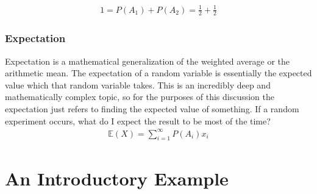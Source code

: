 \documentclass{article}
\begin{document}
\begin{align*}
1 = P(A_1) + P(A_2) = \tfrac{1}{2} + \tfrac{1}{2}
\end{align*}

\subsubsection{Expectation}
Expectation is a mathematical generalization of the weighted average or the arithmetic mean. The expectation of a random variable is essentially the expected value which that random variable takes. This is an incredibly deep and mathematically complex topic, so for the purposes of this discussion the expectation just refers to finding the expected value of something. If a random experiment occurs, what do I expect the result to be most of the time?
\begin{align*}
\mathbb{E}(X) = \sum_{i=1}^{\infty} P(A_i) x_i
\end{align*}


\begin{comment}
\subsubsection{Variable}
Here is a list of variable names.
\begin{enumerate}
\item $\tau$ = Time to Kill
\item $\rho$ = Crit Chance
\item $\phi$ = Headshot Percentage
\item $\alpha$ = Attack Speed
\end{enumerate}

\begin{align*}
P(A_1) = \rho + \phi = 0.55 && P(A_2) = 1 - P(A_1) = 0.45
\end{align*}
\begin{align*}
\mathbb{E}(\tau) = \alpha (P(A_1) (t_1) + P(A_2) t_2)
\end{align*}

\begin{align*}
P(A_1) = \mathbf{HS\%} + \mathbf{C\%} = 0.55 && P(A_2) = 1 - P(A_1) = 0.45
\end{align*}
\begin{align*}
\mathbb{E}(\mathbf{TTK}) = \mathbf{AS} (P(A_1) (t_1) + P(A_2) t_2)
\end{align*}
\end{comment}

\section{An Introductory Example}
\end{document}
